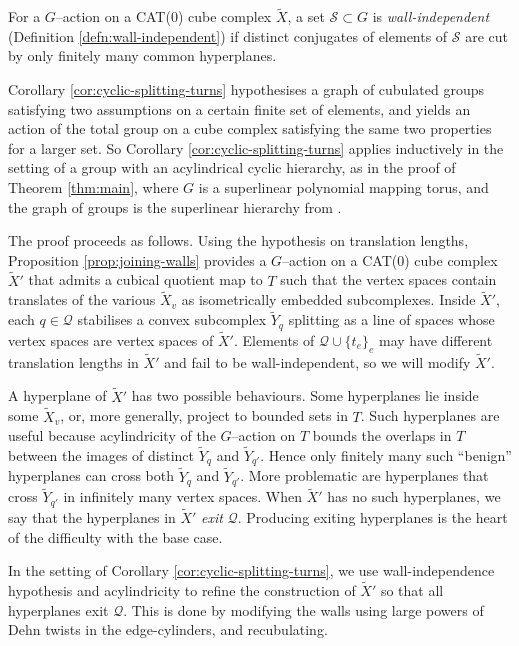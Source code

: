 \documentclass[11pt,oneside]{amsart}
\theoremstyle{definition}
\begin{document}
For a $G$--action on a CAT(0) cube complex $\widetilde X$, a set $\mathcal S\subset G$ is \emph{wall-independent} (Definition \ref{defn:wall-independent}) if distinct conjugates of elements of $\mathcal S$ are cut by only finitely many common hyperplanes.  

Corollary \ref{cor:cyclic-splitting-turns} hypothesises a graph of cubulated groups satisfying two assumptions on a certain finite set of elements, and yields an action of the total group on a cube complex satisfying the same two properties for a larger set.  So Corollary \ref{cor:cyclic-splitting-turns}  applies inductively in the setting of a group with an acylindrical cyclic hierarchy, as in the proof of Theorem \ref{thm:main}, where $G$ is a superlinear polynomial mapping torus, and the graph of groups is the superlinear hierarchy from \cite{Macura:detour}.

The proof proceeds as follows.  Using the hypothesis on translation lengths, Proposition \ref{prop:joining-walls} provides a $G$--action on a CAT(0) cube complex $\widetilde X'$ that admits a cubical quotient map to $T$ such that the vertex spaces contain translates of the various $\widetilde X_v$ as isometrically embedded subcomplexes.  Inside $\widetilde X'$, each $q\in\mathcal Q$ stabilises a convex subcomplex $\widetilde Y_q$ splitting as a line of spaces whose vertex spaces are vertex spaces of $\widetilde X'$.  Elements of $\mathcal Q\cup\{t_e\}_e$ may have different translation lengths in $\widetilde X'$ and fail to be wall-independent, so we will modify $\widetilde X'$.

A hyperplane of $\widetilde X'$ has  two possible behaviours.  Some hyperplanes lie inside some $\widetilde X_v$, or, more generally, project to bounded sets in $T$.  Such hyperplanes are useful because acylindricity of the $G$--action on $T$ bounds the overlaps in $T$ between the images of distinct $\widetilde Y_q$ and $\widetilde Y_{q'}$.  Hence only finitely many such ``benign'' hyperplanes can cross both $\widetilde Y_q$ and $\widetilde Y_{q'}$.  More problematic are hyperplanes that cross $\widetilde Y_{q'}$ in infinitely many vertex spaces.  When $\widetilde X'$ has no such hyperplanes, we say that the hyperplanes in $\widetilde X'$ \emph{exit} $\mathcal Q$.  Producing exiting hyperplanes is the heart of the difficulty with the base case.

In the setting of Corollary \ref{cor:cyclic-splitting-turns}, we use wall-independence hypothesis and acylindricity to refine the construction of $\widetilde X'$ so that all hyperplanes exit $\mathcal Q$.  This is done by modifying the walls using large powers of Dehn twists in the edge-cylinders, and recubulating.  
\end{document}
